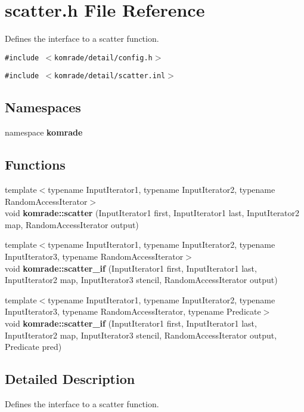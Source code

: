 \section{scatter.h File Reference}
\label{scatter_8h}
Defines the interface to a scatter function. 

{\tt \#include $<$komrade/detail/config.h$>$}\par
{\tt \#include $<$komrade/detail/scatter.inl$>$}\par
\subsection*{Namespaces}
\begin{CompactItemize}
\item 
namespace {\bf komrade}
\end{CompactItemize}
\subsection*{Functions}
\begin{CompactItemize}
\item 
{\footnotesize template$<$typename InputIterator1, typename InputIterator2, typename RandomAccessIterator$>$ }\\void {\bf komrade::scatter} (InputIterator1 first, InputIterator1 last, InputIterator2 map, RandomAccessIterator output)
\item 
{\footnotesize template$<$typename InputIterator1, typename InputIterator2, typename InputIterator3, typename RandomAccessIterator$>$ }\\void {\bf komrade::scatter\_\-if} (InputIterator1 first, InputIterator1 last, InputIterator2 map, InputIterator3 stencil, RandomAccessIterator output)
\item 
{\footnotesize template$<$typename InputIterator1, typename InputIterator2, typename InputIterator3, typename RandomAccessIterator, typename Predicate$>$ }\\void {\bf komrade::scatter\_\-if} (InputIterator1 first, InputIterator1 last, InputIterator2 map, InputIterator3 stencil, RandomAccessIterator output, Predicate pred)
\end{CompactItemize}


\subsection{Detailed Description}
Defines the interface to a scatter function. 

